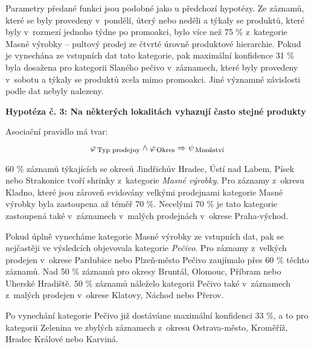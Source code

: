 Parametry předané funkci jsou podobné jako u předchozí hypotézy. Ze záznamů, které se byly provedeny v~pondělí, úterý nebo neděli a týkaly se produktů, které byly v~rozmezí  jednoho týdne po promoakci, bylo více než 75 \% z~kategorie Masné výrobky -- pultový prodej ze čtvrté úrovně produktové hierarchie. Pokud je vynechána ze vstupních dat tato kategorie, pak maximální konfidence 31 \% byla dosažena pro kategorii Slaného pečivo v~záznamech, které byly provedeny v~sobotu a týkaly se produktů zcela mimo promoakci. Jiné významné závislosti podle dat nebyly nalezeny.

\vspace*{1em}

\textbf{Hypotéza č. 3: Na některých lokalitách vyhazují často stejné produkty}

Asociační pravidlo má tvar:
\begin{equation}
    \varphi_{\mbox{\,\footnotesize Typ prodejny}} \land \varphi_{\,\mbox{\footnotesize Okres}} \Rightarrow \psi_{\mbox{\,\footnotesize Množství}}
\end{equation}

60 \% záznamů týkajících se okresů Jindřichův Hradec, Ústí nad Labem, Písek nebo Strakonice tvoří shrinky z~kategorie \emph{Masné výrobky}. Pro záznamy z~okresu Kladno, které jsou zároveň evidovány velkými prodejnami kategorie Masné výrobky byla zastoupena až téměř 70 \%. Necelými 70 \% je tato kategorie zastoupená také v~záznamech v~malých prodejnách v~okrese Praha-východ.

Pokud úplně vynecháme kategorie Masné výrobky ze vstupních dat, pak se nejčastěji ve výsledcích objevovala kategorie \emph{Pečivo}. Pro záznamy z~velkých prodejen v~okrese Pardubice nebo Plzeň-město Pečivo zaujímalo přes 60 \% těchto záznamů. Nad 50 \% záznamů pro okresy Bruntál, Olomouc, Příbram nebo Uherské Hradiště. 50 \% záznamů náleželo kategorii Pečivo také v~záznamech z~malých prodejen v~okrese Klatovy, Náchod nebo Přerov.

Po vynechání kategorie Pečivo již dostáváme maximální konfidenci 33 \%, a to pro kategorii Zelenina ve zbylých záznamech z~okresu Ostrava-město, Kroměříž, Hradec Králové nebo Karviná.

\vspace*{1em}



